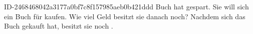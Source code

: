 \begin{exercise}
      {ID-2468468042a3177a0bf7c8f157985aeb0b421ddd}
      {Buch}
  \ifproblem\problem
    \xxb{} hat  gespart. Sie will sich ein Buch für  kaufen.
    Wie viel Geld besitzt sie danach noch?
  \fi
  \ifoutcome\outcome
    Nachdem sich \xxb{} das Buch gekauft hat, besitzt sie noch .
  \fi
\end{exercise}

